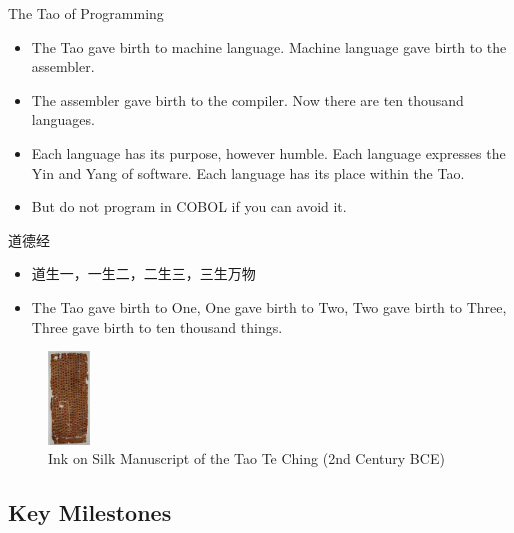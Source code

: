 \documentclass{beamer}
\begin{document}
\begin{frame}[t]{The Tao of Programming}
    \scriptsize
    \begin{itemize}
        \item The Tao gave birth to machine language. Machine language gave birth to the assembler.
        \item The assembler gave birth to the compiler. Now there are ten thousand languages.
        \item Each language has its purpose, however humble. Each language expresses the Yin and Yang of software. Each language has its place within the Tao.
        \item But do not program in COBOL if you can avoid it.
    \end{itemize}
    \begin{block}{道德经}
        \begin{itemize}
            \item 道生一，一生二，二生三，三生万物
            \item The Tao gave birth to One, One gave birth to Two, Two gave birth to Three, Three gave birth to ten thousand things.
        \end{itemize}
    \end{block}
    \begin{figure}
        \includegraphics[width=0.1\textwidth]{images/taoist.jpg}
        \caption{Ink on Silk Manuscript of the Tao Te Ching (2nd Century BCE)}
    \end{figure}
\end{frame}


\subsection{Key Milestones}
\end{document}
